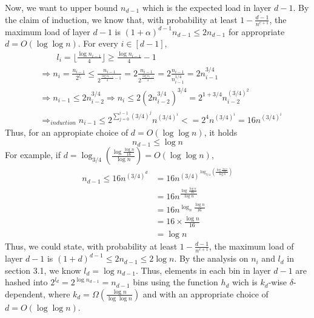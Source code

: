 \documentclass[a4paper, english]{paper}
\begin{document}
Now, we want to upper bound $n_{d-1}$ which is the expected load in layer $d-1$. By the claim of induction, we know that, with probability at least $1-\frac{d-1}{n^{c+1}}$, the maximum load of layer $d-1$ is $(1+\alpha)^{d-1}n_{d-1}\le2n_{d-1}$ for appropriate $d=O(\log\log n)$. For every $i\in[d-1]$, 
\begin{align*}
&\qquad l_i =\lfloor\frac{\log n_{i-1}}4\rfloor \ge \frac{\log n_{i-1}}4 -1\\
&\Rightarrow n_i = \frac{n_{i-1}}{2^{l_i}}\le \frac{n_{i-1}}{2^{\frac{\log n_{i-1}}4 -1}} = 2\frac{n_{i-1}}{2^{\frac{\log n_{i-1}}4}}=2\frac{n_{i-1}}{n_{i-1}^{1/4}}= 2 n_{i-1}^{3/4}\\
&\Rightarrow n_{i-1}\le 2 n_{i-2}^{3/4}\Rightarrow n_i\le 2 (2 n_{i-2}^{3/4})^{3/4}=2^{1+3/4}n_{i-2}^{(3/4)^2}\\
&\Rightarrow_{induction} n_{i-1}\le 2^{\sum_{j=0}^{i-1}(3/4)^j}n^{(3/4)^i}<=2^4n^{(3/4)^i}=16n^{(3/4)^i}
\end{align*}
\quad Thus, for an appropiate choice of $d = O(\log\log n)$, it holds $$n_{d-1}\le \log n$$
\quad For example, if $d = \log_{3/4}\left( \frac{\log \frac{\log n}{16}}{\log n}\right)=O(\log\log n)$,
\begin{align*}
n_{d-1}\le16n^{(3/4)^d}&=16n^{(3/4)^{\log_{3/4}\left( \frac{\log \frac{\log n}{16}}{\log n}\right)}}\\
&= 16n^{\frac{\log \frac{\log n}{16}}{\log n}}\\
&= 16n^{\log_n \frac{\log n}{16}}\\
&= 16\times\frac{\log n}{16}\\
&= \log n
\end{align*}
\quad Thus, we could state, with probability at least $1-\frac{d-1}{n^{c+1}}$, the maximum load of layer $d-1$ is $(1+d)^{d-1}\le2n_{d-1}\le2\log n$. By the analysis on $n_i$ and $l_d$ in section 3.1, we know $l_d = \log n_{d-1}$. Thus, elements in each bin in layer $d-1$ are hashed into $2^{l_d} = 2^{\log n_{d-1}} = n_{d-1}$ bins using the function $h_d$ wich is $k_d$-wise $\delta$-dependent, where $k_d=\Omega(\frac{\log n}{\log\log n})$ and with an appropriate choice of $d=O(\log\log n)$.\\
\end{document}
